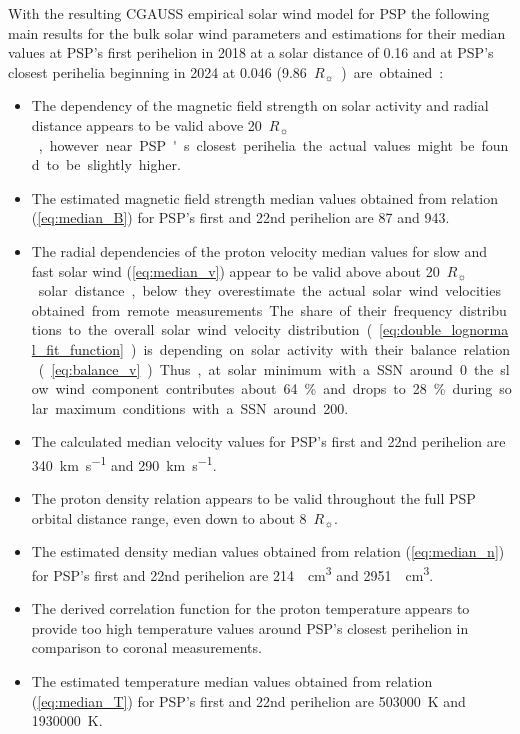 \documentclass[]{aa}
\newcommand{\Rs}{$R_\sun{}$}
\begin{document}
	With the resulting CGAUSS empirical solar wind model for PSP the following main results for the bulk solar wind parameters and estimations for their median values at PSP’s first perihelion in 2018 at a solar distance of \SI{0.16}{\au} and at PSP’s closest perihelia beginning in 2024 at \SI{0.046}{\au} (\SI{9.86}{\Rs}) are obtained:
	\begin{itemize}
		\item The dependency of the magnetic field strength on solar activity and radial distance appears to be valid above \SI{20}{\Rs}, however near PSP's closest perihelia the actual values might be found to be slightly higher.
		\item The estimated magnetic field strength median values obtained from relation (\ref{eq:median_B}) for PSP's first and 22nd perihelion are \SI{87}{\nT} and \SI{943}{\nT}.
		\item The radial dependencies of the proton velocity median values for slow and fast solar wind (\ref{eq:median_v}) appear to be valid above about \SI{20}{\Rs} solar distance, below they overestimate the actual solar wind velocities obtained from remote measurements. The share of their frequency distributions to the overall solar wind velocity distribution (\ref{eq:double_lognormal_fit_function}) is depending on solar activity with their balance relation (\ref{eq:balance_v}). Thus, at solar minimum with a SSN around 0 the slow wind component contributes about \SI{64}{\%} and drops to \SI{28}{\%} during solar maximum conditions with a SSN around 200.
		\item The calculated median velocity values for PSP's first and 22nd perihelion are \SI{340}{\km\per\s} and \SI{290}{\km\per\s}.
		\item The proton density relation appears to be valid throughout the full PSP orbital distance range, even down to about \SI{8}{\Rs}.
		\item The estimated density median values obtained from relation (\ref{eq:median_n}) for PSP's first and 22nd perihelion are \SI{214}{\per\cm\cubed} and \SI{2951}{\per\cm\cubed}.
		\item The derived correlation function for the proton temperature appears to provide too high temperature values around PSP’s closest perihelion in comparison to coronal measurements.
		\item The estimated temperature median values obtained from relation (\ref{eq:median_T}) for PSP's first and 22nd perihelion are \SI{503000}{\K} and \SI{1930000}{\K}.
	\end{itemize}
\end{document}
